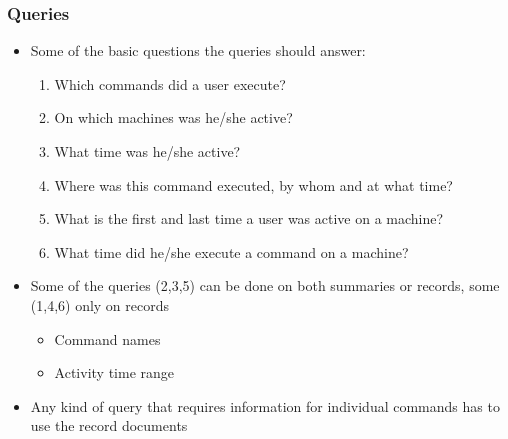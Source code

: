 \documentclass{beamer}
\begin{document}
\begin{frame}[t]
\frametitle{Queries}
\begin{itemize}
\item Some of the basic questions the queries should answer:
\begin{enumerate}
	 \item Which commands did a user execute?
	 \item On which machines was he/she active?
	 \item What time was he/she active?
	 \item Where was this command executed, by whom and at what time?
	 \item What is the first and last time a user was active on a machine?
	 \item What time did he/she execute a command on a machine?
\end{enumerate}
 \item Some of the queries (2,3,5) can be done on both summaries or records, some (1,4,6) only on records
\begin{itemize}
	\item Command names
	\item Activity time range
\end{itemize}
\item Any kind of query that requires information for individual commands has to use the record documents
\end{itemize}
\end{frame}
\end{document}
